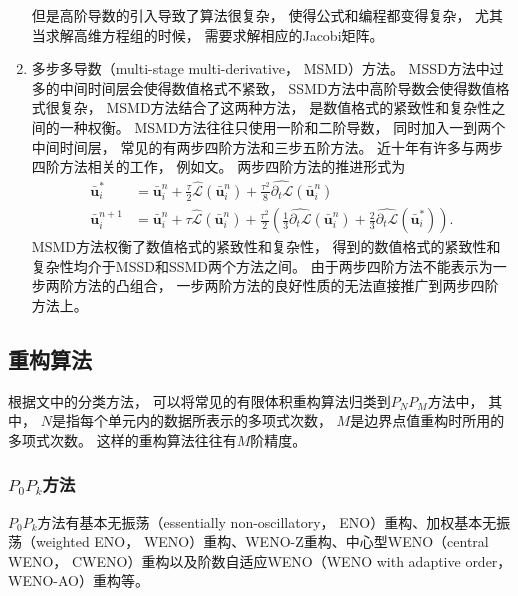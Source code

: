 \begin{enumerate}
        但是高阶导数的引入导致了算法很复杂，
        使得公式和编程都变得复杂，
        尤其当求解高维方程组的时候，
        需要求解相应的Jacobi矩阵。
  \item 多步多导数（multi-stage multi-derivative，
        MSMD）方法。
        MSSD方法中过多的中间时间层会使得数值格式不紧致，
        SSMD方法中高阶导数会使得数值格式很复杂，
        MSMD方法结合了这两种方法，
        是数值格式的紧致性和复杂性之间的一种权衡。
        MSMD方法往往只使用一阶和二阶导数，
        同时加入一到两个中间时间层，
        常见的有两步四阶方法和三步五阶方法。
        近十年有许多与两步四阶方法相关的工作，
        例如文\cite{li2016two,Pan-2016,S2O4_wenli}。
        两步四阶方法的推进形式为
        \begin{align}
          \bar{\bm{u}}_i^{*}   & = \bar{\bm{u}}_i^n + \frac{\tau}{2} \hat{\mathcal{L}}(\bar{\bm{u}}_i^{n}) + \frac{\tau^2}{8} \widehat{{\partial_t}\mathcal{L}}(\bar{\bm{u}}_i^{n})                                                                                   \\
          \bar{\bm{u}}_i^{n+1} & = \bar{\bm{u}}_i^n + \tau \hat{\mathcal{L}}(\bar{\bm{u}}_i^{n}) + \frac{\tau^2}{2} \left(\frac{1}{3}\widehat{{\partial_t}\mathcal{L}}(\bar{\bm{u}}_i^{n}) +\frac{2}{3}\widehat{{\partial_t}\mathcal{L}}(\bar{\bm{u}}_i^{*})\right).
        \end{align}
        MSMD方法权衡了数值格式的紧致性和复杂性，
        得到的数值格式的紧致性和复杂性均介于MSSD和SSMD两个方法之间。
        由于两步四阶方法不能表示为一步两阶方法的凸组合，
        一步两阶方法的良好性质的无法直接推广到两步四阶方法上。
\end{enumerate}

\subsection{重构算法}

根据文\cite{PNPM}中的分类方法，
可以将常见的有限体积重构算法归类到$P_NP_M$方法中，
其中，
$N$是指每个单元内的数据所表示的多项式次数，
$M$是边界点值重构时所用的多项式次数。
这样的重构算法往往有$M$阶精度。

\subsubsection{$P_0P_k$方法}

$P_0P_k$方法有基本无振荡（essentially non-oscillatory，
ENO）重构、加权基本无振荡（weighted ENO，
WENO）重构、WENO-Z重构、中心型WENO（central WENO，
CWENO）重构以及阶数自适应WENO（WENO with adaptive order，
WENO-AO）重构等。

